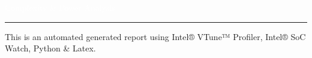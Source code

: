 \begin{titlepage}
\BgThispage
{}
\noindent
\textcolor{white}{\bigsf Complexity \& Power Analysis}
\vspace*{2.5cm}\par
\noindent
\begin{minipage}{0.35\linewidth}
    \begin{flushright}
        \printauthor
    \end{flushright}
\end{minipage} \hspace{15pt}
%
\begin{minipage}{0.02\linewidth}
    \rule{2pt}{275pt}
\end{minipage} \hspace{-10pt}
%
\begin{minipage}{0.6\linewidth}
\vspace{5pt}

{\huge This is an automated generated report using Intel® VTune™ Profiler, Intel® SoC Watch, Python \& Latex.}
\newline {}

\end{minipage}
\end{titlepage}

\restoregeometry%